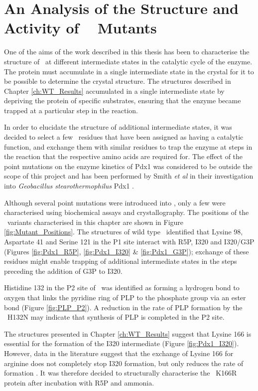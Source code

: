 \chapter{An Analysis of the Structure and Activity of \atpdx~ Mutants}\label{ch:Mutant_Results}

One of the aims of the work described in this thesis has been to characterise the structure of \atpdx ~at different intermediate states in the catalytic cycle of the enzyme. The protein must accumulate in a single intermediate state in the crystal for it to be possible to determine the crystal structure. The structures described in Chapter \ref{ch:WT_Results} accumulated in a single intermediate state by depriving the protein of specific substrates, ensuring that the enzyme became trapped at a particular step in the reaction. 

In order to elucidate the structure of additional intermediate states, it was decided to select a few \atpdx ~residues that have been assigned as having a catalytic function, and exchange them with similar residues to trap the enzyme at steps in the reaction that the respective amino acids are required for. The effect of the point mutations on the enzyme kinetics of Pdx1 was considered to be outside the scope of this project and has been performed by Smith \textit{et al} in their investigation into \textit{Geobacillus stearothermophilus} Pdx1 \cite{Smith2015}.  
 
Although several point mutations were introduced into \atpdx , only a few were characterised using biochemical assays and crystallography. The positions of the \atpdx ~variants characterised in this chapter are shown in Figure \ref{fig:Mutant_Positions}. The structures of wild type \atpdx ~identified that Lysine 98, Aspartate 41 and Serine 121 in the P1 site interact with R5P, I320 and I320/G3P (Figures \ref{fig:Pdx1_R5P}, \ref{fig:Pdx1_I320} \& \ref{fig:Pdx1_G3P}); exchange of these residues might enable trapping of additional intermediate states in the steps preceding the addition of G3P to I320. 

Histidine 132 in the P2 site of \atpdx ~was identified as forming a hydrogen bond to oxygen that links the pyridine ring of PLP to the phosphate group via an ester bond (Figure \ref{fig:PLP_P2}). A reduction in the rate of PLP formation by the \atpdx ~H132N may indicate that synthesis of PLP is completed in the P2 site.      

The structures presented in Chapter \ref{ch:WT_Results} suggest that Lysine 166 is essential for the formation of the I320 intermediate (Figure \ref{fig:Pdx1_I320}). However, data in the literature suggest that the exchange of Lysine 166 for arginine does not completely stop I320 formation, but only reduces the rate of formation \cite{Raschle2007}. It was therefore decided to structurally characterise the \atpdx ~K166R protein after incubation with R5P and ammonia.   


